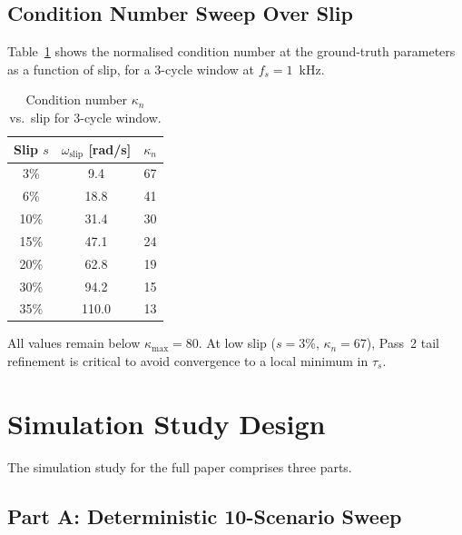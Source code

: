 \documentclass[11pt,a4paper]{article}
\newcommand{\omegas}{\omega_{\text{slip}}}
\newcommand{\taus}{\tau_s}
\begin{document}
\subsection{Condition Number Sweep Over Slip}

Table~\ref{tab:kappa} shows the normalised condition number at the ground-truth
parameters as a function of slip, for a 3-cycle window at $f_s = 1$~kHz.

\begin{table}[ht]
  \centering
  \caption{Condition number $\kappa_n$ vs.\ slip for 3-cycle window.}
  \label{tab:kappa}
  \begin{tabular}{ccc}
    \toprule
    Slip $s$ & $\omegas$ [rad/s] & $\kappa_n$ \\
    \midrule
    3\%  &  9.4 & 67 \\
    6\%  & 18.8 & 41 \\
    10\% & 31.4 & 30 \\
    15\% & 47.1 & 24 \\
    20\% & 62.8 & 19 \\
    30\% & 94.2 & 15 \\
    35\% & 110.0 & 13 \\
    \bottomrule
  \end{tabular}
\end{table}

All values remain below $\kappa_{\max} = 80$.  At low slip ($s = 3\%$,
$\kappa_n = 67$), Pass~2 tail refinement is critical to avoid convergence to
a local minimum in $\taus$.

\section{Simulation Study Design}
\label{sec:sim}

The simulation study for the full paper comprises three parts.

\subsection{Part A: Deterministic 10-Scenario Sweep}
\end{document}
